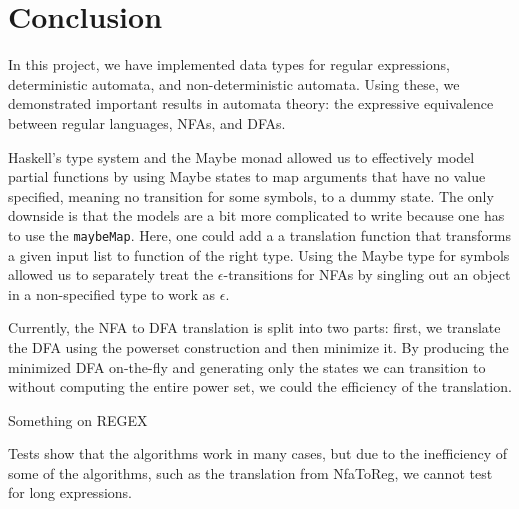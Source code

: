 \section{Conclusion}\label{sec:Conclusion}

In this project, we have implemented data types for regular expressions, deterministic automata, and non-deterministic automata. 
Using these, we demonstrated important results in automata theory: the expressive equivalence between regular languages, NFAs, and DFAs.

Haskell's type system and the Maybe monad allowed us to effectively model partial functions by using Maybe states to map arguments that have no value specified, meaning no transition for some symbols, to a dummy state. The only downside is that the models are a bit more complicated to write because one has to use the \texttt{maybeMap}. Here, one could add a a translation function that transforms a given input list to function of the right type. 
Using the Maybe type for symbols allowed us to separately treat the $\epsilon$-transitions for NFAs by singling out an object in a non-specified type to work as $\epsilon$. 

Currently, the NFA to DFA translation is split into two parts: first, we translate the DFA using the powerset construction and then minimize it. By producing the minimized DFA on-the-fly and generating only the states we can transition to without computing the entire power set, we could the efficiency of the translation.

Something on REGEX

Tests show that the algorithms work in many cases, but due to the inefficiency of some of the algorithms, such as the translation from NfaToReg, we cannot test for long expressions. 




